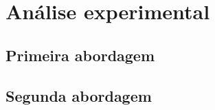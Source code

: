 \section{Análise experimental}
\label{sec:imageblur/experimental}

\subsection{Primeira abordagem}

\subsection{Segunda abordagem}

